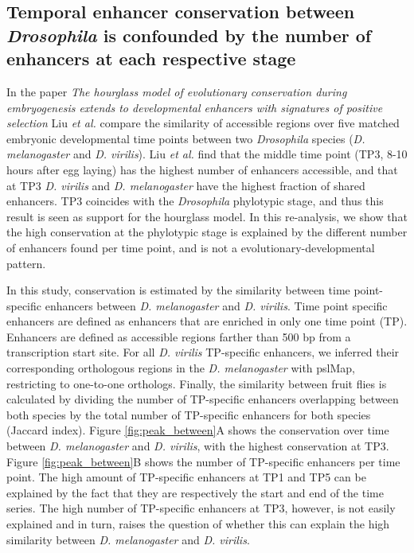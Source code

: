 \subsection{Temporal enhancer conservation between \textit{Drosophila} is confounded by the number of enhancers at each respective stage} \label{subsection:liu}

In the paper \textit{The hourglass model of evolutionary conservation during embryogenesis extends to developmental enhancers with signatures of positive selection}\cite{Liu2021} Liu \textit{et al.} compare the similarity of accessible regions over five matched embryonic developmental time points between two \textit{Drosophila} species (\textit{D. melanogaster} and \textit{D. virilis}). Liu \textit{et al.} find that the middle time point (TP3, 8-10 hours after egg laying) has the highest number of enhancers accessible, and that at TP3 \textit{D. virilis} and \textit{D. melanogaster} have the highest fraction of shared enhancers. TP3 coincides with the \textit{Drosophila} phylotypic stage, and thus this result is seen as support for the hourglass model. In this re-analysis, we show that the high conservation at the phylotypic stage is explained by the different number of enhancers found per time point, and is not a evolutionary-developmental pattern.

In this study, conservation is estimated by the similarity between time point-specific enhancers between \textit{D. melanogaster} and \textit{D. virilis}. Time point specific enhancers are defined as enhancers that are enriched in only one time point (TP). Enhancers are defined as accessible regions farther than 500 bp from a transcription start site. For all \textit{D. virilis} TP-specific enhancers, we inferred their corresponding orthologous regions in the \textit{D. melanogaster} with pslMap, restricting to one-to-one orthologs. Finally, the similarity between fruit flies is calculated by dividing the number of TP-specific enhancers overlapping between both species by the total number of TP-specific enhancers for both species (Jaccard index). Figure \ref{fig:peak_between}A shows the conservation over time between \textit{D. melanogaster} and \textit{D. virilis}, with the highest conservation at TP3. Figure \ref{fig:peak_between}B shows the number of  TP-specific enhancers per time point. The high amount of TP-specific enhancers at TP1 and TP5 can be explained by the fact that they are respectively the start and end of the time series. The high number
of TP-specific enhancers at TP3, however, is not easily explained and in turn, raises the question of whether this can explain the high similarity between \textit{D. melanogaster} and \textit{D. virilis}.

